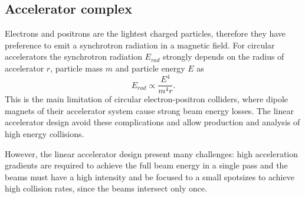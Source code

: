 

\subsection{Accelerator complex}
Electrons and positrons are the lightest charged particles, therefore they have preference to emit a synchrotron radiation in a magnetic field. For circular accelerators the synchrotron radiation $E_{rad}$ strongly depends on the radius of accelerator $r$, particle mass $m$ and particle energy $E$ as
\begin{equation}
	E_{rad} \propto \frac{E^4}{m^4r}.
\end{equation}
This is the main limitation of circular electron-positron colliders, where dipole magnets of their accelerator system cause strong beam energy losses. 
The linear accelerator design avoid these complications and allow production and analysis of high energy collisions. 

However, the linear accelerator design present many challenges: high acceleration gradients are required to achieve the full beam energy in a single pass and the beams must have a high intensity and be focused to a small spotsizes to achieve high collision rates, since the beams intersect only once.

